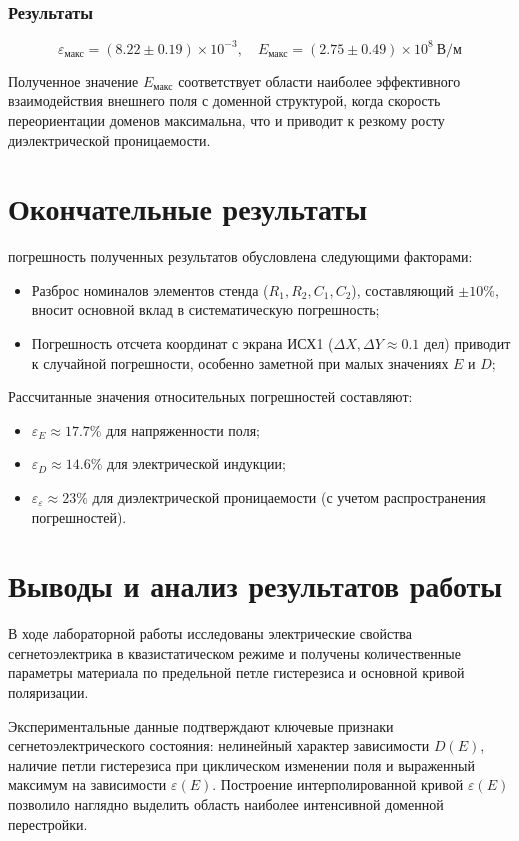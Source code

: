\documentclass[a4paper,14pt]{article}
\begin{document}
\subsubsection*{Результаты}

\[
\boxed{\varepsilon_{\text{макс}} = (8.22 \pm 0.19) \times 10^{-3}, \quad E_{\text{макс}} = (2.75 \pm 0.49) \times 10^8 \ \text{В/м}}
\]

Полученное значение \(E_{\text{макс}}\) соответствует области наиболее эффективного взаимодействия внешнего поля с доменной структурой, когда скорость переориентации доменов максимальна, что и приводит к резкому росту диэлектрической проницаемости.

    \section{Окончательные результаты}
погрешность полученных результатов обусловлена следующими факторами:
\begin{itemize}
    \item Разброс номиналов элементов стенда (\(R_1, R_2, C_1, C_2\)), составляющий \(\pm 10\%\), вносит основной вклад в систематическую погрешность;
    \item Погрешность отсчета координат с экрана ИСХ1 (\(\Delta X, \Delta Y \approx 0.1\) дел) приводит к случайной погрешности, особенно заметной при малых значениях \(E\) и \(D\);
\end{itemize}

Рассчитанные значения относительных погрешностей составляют:
\begin{itemize}
    \item \(\varepsilon_E \approx 17.7\%\) для напряженности поля;
    \item \(\varepsilon_D \approx 14.6\%\) для электрической индукции;
    \item \(\varepsilon_{\varepsilon} \approx 23\%\) для диэлектрической проницаемости (с учетом распространения погрешностей).
\end{itemize}
    \section{Выводы и анализ результатов работы}
    В ходе лабораторной работы исследованы электрические свойства сегнетоэлектрика в квазистатическом режиме и получены количественные параметры материала по предельной петле гистерезиса и основной кривой поляризации.

    Экспериментальные данные подтверждают ключевые признаки сегнетоэлектрического состояния: нелинейный характер зависимости \(D(E)\), наличие петли гистерезиса при циклическом изменении поля и выраженный максимум на зависимости \(\varepsilon(E)\). Построение интерполированной кривой \(\varepsilon(E)\) позволило наглядно выделить область наиболее интенсивной доменной перестройки.
\end{document}
